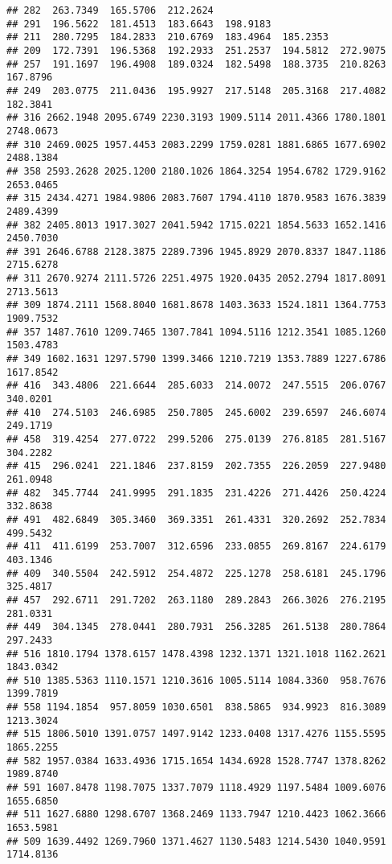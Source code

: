 \documentclass[
]{article}
\begin{document}
\begin{verbatim}
## 282  263.7349  165.5706  212.2624                                        
## 291  196.5622  181.4513  183.6643  198.9183                              
## 211  280.7295  184.2833  210.6769  183.4964  185.2353                    
## 209  172.7391  196.5368  192.2933  251.2537  194.5812  272.9075          
## 257  191.1697  196.4908  189.0324  182.5498  188.3735  210.8263  167.8796
## 249  203.0775  211.0436  195.9927  217.5148  205.3168  217.4082  182.3841
## 316 2662.1948 2095.6749 2230.3193 1909.5114 2011.4366 1780.1801 2748.0673
## 310 2469.0025 1957.4453 2083.2299 1759.0281 1881.6865 1677.6902 2488.1384
## 358 2593.2628 2025.1200 2180.1026 1864.3254 1954.6782 1729.9162 2653.0465
## 315 2434.4271 1984.9806 2083.7607 1794.4110 1870.9583 1676.3839 2489.4399
## 382 2405.8013 1917.3027 2041.5942 1715.0221 1854.5633 1652.1416 2450.7030
## 391 2646.6788 2128.3875 2289.7396 1945.8929 2070.8337 1847.1186 2715.6278
## 311 2670.9274 2111.5726 2251.4975 1920.0435 2052.2794 1817.8091 2713.5613
## 309 1874.2111 1568.8040 1681.8678 1403.3633 1524.1811 1364.7753 1909.7532
## 357 1487.7610 1209.7465 1307.7841 1094.5116 1212.3541 1085.1260 1503.4783
## 349 1602.1631 1297.5790 1399.3466 1210.7219 1353.7889 1227.6786 1617.8542
## 416  343.4806  221.6644  285.6033  214.0072  247.5515  206.0767  340.0201
## 410  274.5103  246.6985  250.7805  245.6002  239.6597  246.6074  249.1719
## 458  319.4254  277.0722  299.5206  275.0139  276.8185  281.5167  304.2282
## 415  296.0241  221.1846  237.8159  202.7355  226.2059  227.9480  261.0948
## 482  345.7744  241.9995  291.1835  231.4226  271.4426  250.4224  332.8638
## 491  482.6849  305.3460  369.3351  261.4331  320.2692  252.7834  499.5432
## 411  411.6199  253.7007  312.6596  233.0855  269.8167  224.6179  403.1346
## 409  340.5504  242.5912  254.4872  225.1278  258.6181  245.1796  325.4817
## 457  292.6711  291.7202  263.1180  289.2843  266.3026  276.2195  281.0331
## 449  304.1345  278.0441  280.7931  256.3285  261.5138  280.7864  297.2433
## 516 1810.1794 1378.6157 1478.4398 1232.1371 1321.1018 1162.2621 1843.0342
## 510 1385.5363 1110.1571 1210.3616 1005.5114 1084.3360  958.7676 1399.7819
## 558 1194.1854  957.8059 1030.6501  838.5865  934.9923  816.3089 1213.3024
## 515 1806.5010 1391.0757 1497.9142 1233.0408 1317.4276 1155.5595 1865.2255
## 582 1957.0384 1633.4936 1715.1654 1434.6928 1528.7747 1378.8262 1989.8740
## 591 1607.8478 1198.7075 1337.7079 1118.4929 1197.5484 1009.6076 1655.6850
## 511 1627.6880 1298.6707 1368.2469 1133.7947 1210.4423 1062.3666 1653.5981
## 509 1639.4492 1269.7960 1371.4627 1130.5483 1214.5430 1040.9591 1714.8136

\end{verbatim}
\end{document}
